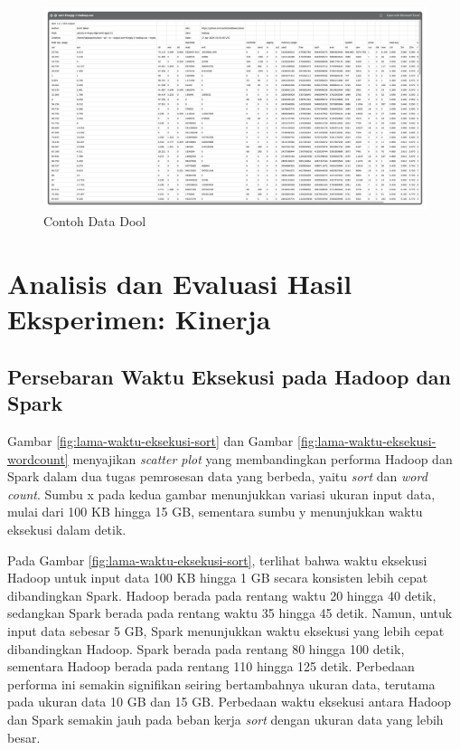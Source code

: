 \begin{landscape}
\begin{figure}[h]
    \centering
    \includegraphics[width=\linewidth, height=0.5\linewidth]{figures/ch04/data-dool-dalam}
    \caption{Contoh Data Dool}
    \label{fig:data-dool-dalam}
\end{figure}
\end{landscape}

\section {Analisis dan Evaluasi Hasil Eksperimen: Kinerja}
\subsection{Persebaran Waktu Eksekusi pada Hadoop dan Spark}

Gambar \ref{fig:lama-waktu-eksekusi-sort} dan Gambar \ref{fig:lama-waktu-eksekusi-wordcount} menyajikan \textit{scatter plot} yang membandingkan performa Hadoop dan Spark dalam dua tugas pemrosesan data yang berbeda, yaitu \textit{sort} dan \textit{word count}. Sumbu x pada kedua gambar menunjukkan variasi ukuran input data, mulai dari 100 KB hingga 15 GB, sementara sumbu y menunjukkan waktu eksekusi dalam detik.

Pada Gambar \ref{fig:lama-waktu-eksekusi-sort}, terlihat bahwa waktu eksekusi Hadoop untuk input data 100 KB hingga 1 GB secara konsisten lebih cepat dibandingkan Spark. Hadoop berada pada rentang waktu 20 hingga 40 detik, sedangkan Spark berada pada rentang waktu 35 hingga 45 detik. Namun, untuk input data sebesar 5 GB, Spark menunjukkan waktu eksekusi yang lebih cepat dibandingkan Hadoop. Spark berada pada rentang 80 hingga 100 detik, sementara Hadoop berada pada rentang 110 hingga 125 detik. Perbedaan performa ini semakin signifikan seiring bertambahnya ukuran data, terutama pada ukuran data 10 GB dan 15 GB. Perbedaan waktu eksekusi antara Hadoop dan Spark semakin jauh pada beban kerja \textit{sort} dengan ukuran data yang lebih besar.

